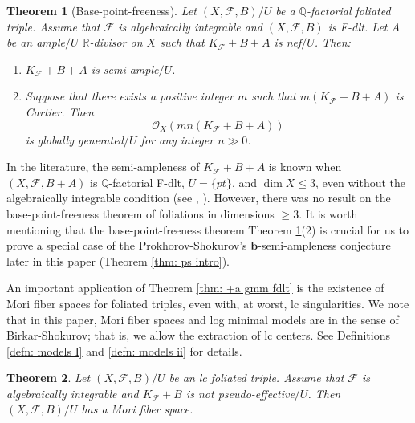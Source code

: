 \documentclass[11pt]{amsart}
\numberwithin{equation}{section}
\newcommand{\bb}{\bm{b}}
\newcommand{\Qq}{\mathbb{Q}}
\newcommand{\Rr}{\mathbb{R}}
\newcommand{\Ff}{\mathcal{F}}
\newtheorem{thm}{Theorem}[subsection]
\theoremstyle{definition}
\theoremstyle{definition}
\theoremstyle{definition}
\begin{document}
\begin{thm}[Base-point-freeness]\label{thm: bpf fdlt}
  Let $(X,\Ff,B)/U$ be a $\Qq$-factorial foliated triple. Assume that $\Ff$ is algebraically integrable and $(X,\Ff,B)$ is F-dlt. Let $A$ be an ample$/U$ $\Rr$-divisor on $X$ such that $K_{\Ff}+B+A$ is nef$/U$. Then:
  \begin{enumerate}
      \item $K_{\Ff}+B+A$ is semi-ample$/U$.
      \item Suppose that there exists a positive integer $m$ such that $m(K_{\Ff}+B+A)$ is Cartier. Then
      $$\mathcal{O}_X(mn(K_{\Ff}+B+A))$$
      is globally generated$/U$ for any integer $n\gg 0$.
    \end{enumerate}
\end{thm}
In the literature, the semi-ampleness of $K_\Ff+B+A$ is known when $(X,\Ff,B+A)$ is $\mathbb Q$-factorial F-dlt, $U=\{pt\}$, and $\dim X\leq 3$, even without the algebraically integrable condition (see \cite[Theorem 1.3]{CS20}, \cite[Theorem 1.3]{CS21}). However, there was no result on the base-point-freeness theorem of foliations in dimensions $\geq 3$. It is worth mentioning that the base-point-freeness theorem Theorem \ref{thm: bpf fdlt}(2) is crucial for us to prove a special case of the Prokhorov-Shokurov's $\bb$-semi-ampleness conjecture later in this paper (Theorem \ref{thm: ps intro}).

An important application of Theorem \ref{thm: +a gmm fdlt} is the existence of Mori fiber spaces for foliated triples, even with, at worst, lc singularities. We note that in this paper, Mori fiber spaces and log minimal models are in the sense of Birkar-Shokurov; that is, we allow the extraction of lc centers. See Definitions \ref{defn: models I} and \ref{defn: models ii} for details.

\begin{thm}\label{thm: eomfs}
    Let $(X,\Ff,B)/U$ be an lc foliated triple. Assume that $\Ff$ is algebraically integrable and $K_{\Ff}+B$ is not pseudo-effective$/U$. Then $(X,\Ff,B)/U$ has a Mori fiber space.
\end{thm}
\end{document}
